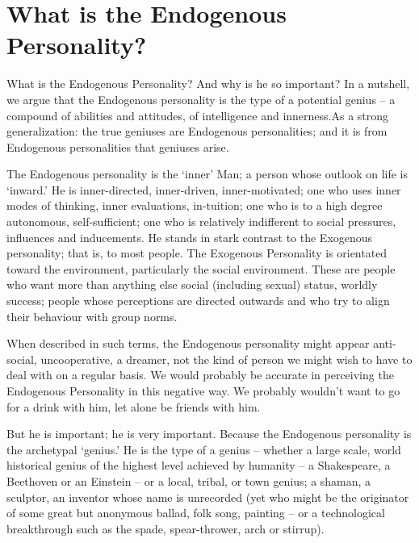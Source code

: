 \documentclass[
]{book}
\begin{document}
\hypertarget{what-is-the-endogenous-personality}{%
\chapter{What is the Endogenous Personality?}\label{what-is-the-endogenous-personality}}

What is the Endogenous Personality? And why is he so important?
In a nutshell, we argue that the Endogenous personality is the type of a potential genius -- a compound of abilities and attitudes, of intelligence and innerness.As a strong generalization: the true geniuses are Endogenous personalities; and it is from Endogenous personalities that geniuses arise.

The Endogenous personality is the `inner' Man; a person whose outlook on life is `inward.' He is inner-directed, inner-driven, inner-motivated; one who uses inner modes of thinking, inner evaluations, in-tuition; one who is to a high degree autonomous, self-sufficient; one who is relatively indifferent to social pressures, influences and inducements.
He stands in stark contrast to the Exogenous personality; that is, to most people. The Exogenous Personality is orientated toward the environment, particularly the social environment. These are people who want more than anything else social (including sexual) status, worldly success; people whose perceptions are directed outwards and who try to align their behaviour with group norms.

When described in such terms, the Endogenous personality might appear anti-social, uncooperative, a dreamer, not the kind of person we might wish to have to deal with on a regular basis. We would probably be accurate in perceiving the Endogenous Personality in this negative way. We probably wouldn't want to go for a drink with him, let alone be friends with him.

But he is important; he is very important. Because the Endogenous personality is the archetypal `genius.' He is the type of a genius -- whether a large scale, world historical genius of the highest level achieved by humanity -- a Shakespeare, a Beethoven or an Einstein -- or a local, tribal, or town genius; a shaman, a sculptor, an inventor whose name is unrecorded (yet who might be the originator of some great but anonymous ballad, folk song, painting -- or a technological breakthrough such as the spade, spear-thrower, arch or stirrup).
\end{document}

